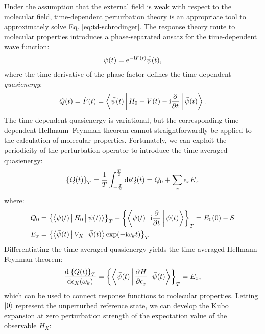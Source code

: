 Under the assumption that the external field is weak with respect to the
molecular field, time-dependent perturbation theory is an appropriate
tool to approximately solve Eq. \eqref{eq:td-schrodinger}.
The response theory route to molecular properties introduces a
phase-separated ansatz for the time-dependent wave function:
\begin{equation}\label{eq:phase-separated}
  \psi(t) = \mathrm{e}^{-\mathrm{i}F(t)}\bar{\psi}(t),
\end{equation}
where the time-derivative of the phase factor defines the time-dependent
\emph{quasienergy}:
\begin{equation}
  Q(t) = \dot{F}(t) = \Braket{\bar{\psi}(t) |
  H_0 + V(t) - \mathrm{i}\frac{\partial^{}} {\partial t^{}}
  | \bar{\psi}(t)}.
\end{equation}
The time-dependent quasienergy is variational, but the corresponding
time-dependent Hellmann--Feynman theorem cannot straightforwardly be
applied to the calculation of molecular properties.\autocite{Christiansen1998-pe, Pawlowski2015-sq}
Fortunately, we can exploit the periodicity of the perturbation operator
to introduce the time-averaged quasienergy:
\begin{equation}
  \left\lbrace Q(t)\right\rbrace_T =
 \frac{1}{T} \int_{-\frac{T}{2}}^{\frac{T}{2}} \mathop{}\!\mathrm{d} t Q(t) =
 Q_0 + \sum_{x}\epsilon_x E_x
\end{equation}
where:
\begin{subequations}
 \begin{align}
  Q_0 &= \left\lbrace \Braket{\bar{\psi}(t) | H_0 | \bar{\psi}(t)} \right\rbrace_T
- \left\lbrace \Braket{\bar{\psi}(t) | \mathrm{i} \frac{\partial^{}} {\partial t^{}} | \bar{\psi}(t)}\right\rbrace_T = E_0(0) - S \\
  E_x &= \left\lbrace \Braket{\bar{\psi}(t) | V_X | \bar{\psi}(t)}\exp(-\mathrm{i}\omega_k t) \right\rbrace_T
 \end{align}
\end{subequations}
Differentiating the time-averaged quasienergy yields the time-averaged
Hellmann--Feynman theorem:
\begin{equation}\label{eq:tave-hellfeyn}
  \frac{\mathop{}\!\mathrm{d}^{}\left\lbrace Q(t)\right\rbrace_T}{\mathop{}\!\mathrm{d} \epsilon_X(\omega_k)^{}}
  =
  \left\lbrace\Braket{\bar{\psi}(t) | \frac{\partial^{}H} {\partial \epsilon_x^{}} | \bar{\psi}(t)}\right\rbrace_T
  = E_x,
\end{equation}
which can be used to connect response functions to molecular properties.
Letting $\ket{0}$ represent the unperturbed reference state, we can
develop the Kubo expansion at zero perturbation strength of the
expectation value of the observable $H_X$:\autocite{Kubo1957-ay}
